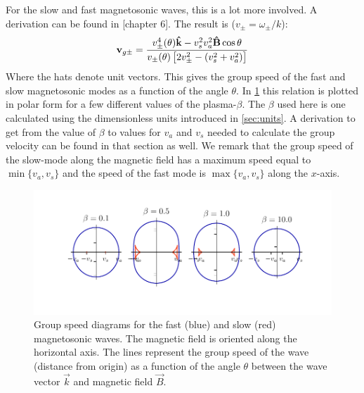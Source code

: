 For the slow and fast magnetosonic waves, this is a lot more involved. A derivation can be found in \cite{elementary-space-plasma} [chapter 6].
The result is ($v_\pm=\omega_\pm/k$):
\begin{equation}
	\mathbf{v}_{g\pm} = \frac{v_\pm^4(\theta)\mathbf{\hat{k}} - v_s^2v_a^2\mathbf{\hat{B}}\cos\theta}{v_\pm(\theta) \left[ 2v_\pm^2-(v_s^2+v_a^2) \right]}
	\label{eq:magnetoaccoustic-group-speed}
\end{equation}
Where the hats denote unit vectors.
This gives the group speed of the fast and slow magnetosonic modes as a function of the angle $\theta$.
In \cref{fig:MHD-group-speed} this relation is plotted in polar form for a few different values of the plasma-$\beta$.
The $\beta$ used here is one calculated using the dimensionless units introduced in \cref{sec:units}. 
A derivation to get from the value of $\beta$ to values for $v_a$ and $v_s$ needed to calculate the group velocity can be found in that section as well.
We remark that the group speed of the slow-mode along the magnetic field has a maximum speed equal to $\min\{v_a,v_s\}$ and the speed of the fast mode is $\max\{v_a,v_s\}$ along the $x$-axis.

\begin{figure}[H]
	\centering
	\includegraphics[width=\linewidth]{images/MHD-group-speed.pdf}
	\caption{Group speed diagrams for the fast (blue) and slow (red) magnetosonic waves. The magnetic field is oriented along the horizontal axis. The lines represent the group speed of the wave (distance from origin) as a function of the angle $\theta$ between the wave vector $\vec{k}$ and magnetic field $\vec{B}$.}
	\label{fig:MHD-group-speed}
\end{figure}








